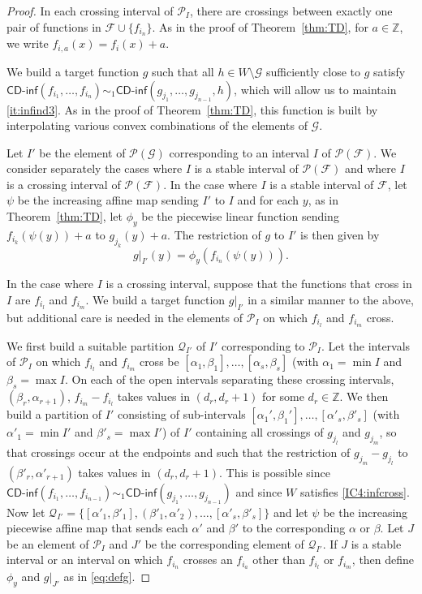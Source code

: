 \documentclass{daj}
\newcommand{\Z}{\mathbb Z}
\newcommand{\cdinf}{\textsf{CD-inf}}
\begin{document}
\begin{proof}
In each crossing interval of $\mathcal P_I$, there are crossings between exactly one pair of functions
in $\mathcal F\cup\{f_{i_n}\}$.
As in the proof of Theorem~\ref{thm:TD}, for $a\in\Z$, we write $f_{i,a}(x)=f_i(x)+a$.

We build a target function $g$ such that all $h\in W\setminus\mathcal G$
sufficiently close to $g$ satisfy $\cdinf(f_{i_1},\ldots,f_{i_n})\sim_1\cdinf(g_{j_1},
\ldots,g_{j_{n-1}},h)$,
which will allow us to maintain \ref{it:infind3}. As in the proof of Theorem~\ref{thm:TD}, this function is built
by interpolating various convex combinations of the elements of $\mathcal G$.

Let $I'$ be the element of $\mathcal P(\mathcal G)$ corresponding to an interval $I$ of
$\mathcal P(\mathcal F)$. We consider separately the cases where
$I$ is a stable interval of $\mathcal P(\mathcal F)$ and where $I$ is a crossing
interval of $\mathcal P(\mathcal F)$.
In the case where $I$ is a stable interval of $\mathcal F$, let $\psi$ be the increasing affine map sending
$I'$ to $I$ and for each $y$, as in Theorem~\ref{thm:TD},
let $\phi_y$ be the piecewise linear function sending $f_{i_k}(\psi(y))+a$ to $g_{j_k}(y)+a$.
The restriction of $g$ to $I'$ is then given by
\begin{equation}\label{eq:defg}
g|_{I'}(y)=\phi_y(f_{i_n}(\psi(y))).
\end{equation}

In the case where $I$ is a crossing interval, suppose that the functions that cross in
$I$ are $f_{i_l}$ and $f_{i_m}$.
We build a target function $g|_{I'}$ in a similar manner to the above, but additional care is needed in
the elements of $\mathcal P_I$ on which $f_{i_l}$ and $f_{i_m}$ cross.

We first build a suitable
partition $\mathcal Q_{I'}$ of $I'$ corresponding to $\mathcal P_I$.
Let the intervals of $\mathcal P_I$ on which $f_{i_l}$ and $f_{i_m}$ cross be
$[\alpha_1,\beta_1],\ldots,[\alpha_s,\beta_s]$ (with $\alpha_1=\min I$ and $\beta_s=\max I$.
On each of the open intervals separating
these crossing intervals, $(\beta_r,\alpha_{r+1})$, $f_{i_m}-f_{i_l}$ takes values in
$(d_r,d_r+1)$ for some $d_r\in\Z$. We then build a partition of $I'$ consisting of sub-intervals
$[\alpha_1',\beta_1'],\ldots, [\alpha'_s,\beta'_s]$ (with $\alpha'_1=\min I'$ and $\beta'_s=\max I'$)
of $I'$ containing all crossings of $g_{j_l}$ and $g_{j_m}$, so that crossings occur at the endpoints
and such that the restriction of $g_{j_m}-g_{j_l}$ to $(\beta'_r,\alpha'_{r+1})$
takes values in $(d_r,d_r+1)$.
This is possible since $\cdinf(f_{i_1},\ldots,f_{i_{n-1}})\sim_1
\cdinf(g_{j_1},\ldots,g_{j_{n-1}})$ and since $W$ satisfies \ref{IC4:infcross}.
Now let $\mathcal Q_{I'}=\{[\alpha'_1,\beta'_1],(\beta'_1,\alpha'_2),\ldots,[\alpha'_s,\beta'_s]\}$
and let $\psi$ be the increasing piecewise affine map that sends each $\alpha'$
and $\beta'$ to the corresponding
$\alpha$ or $\beta$.
Let $J$ be an element of $\mathcal P_I$ and $J'$ be the corresponding element of $\mathcal Q_{I'}$.
If $J$ is a stable interval or an interval
on which $f_{i_n}$ crosses an $f_{i_a}$ other than $f_{i_l}$ or $f_{i_m}$,
then define $\phi_y$ and $g|_{J'}$ as in \eqref{eq:defg}.


\end{proof}
\end{document}
